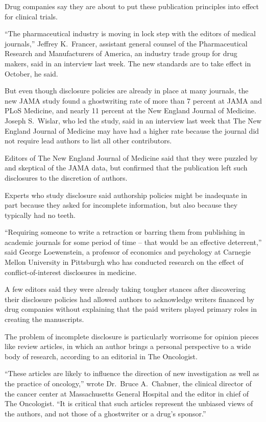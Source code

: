 ﻿\documentclass[12pt]{article}
\begin{document}
Drug companies say they are about to put these publication principles into effect for clinical
trials.

``The pharmaceutical industry is moving in lock step with the editors of medical journals,'' Jeffrey
K.~Francer, assistant general counsel of the Pharmaceutical Research and Manufacturers of America,
an industry trade group for drug makers, said in an interview last week. The new standards are to
take effect in October, he said.

But even though disclosure policies are already in place at many journals, the new JAMA study found
a ghostwriting rate of more than 7 percent at JAMA and PLoS Medicine, and nearly 11 percent at the
New England Journal of Medicine. Joseph S.~Wislar, who led the study, said in an interview last week
that The New England Journal of Medicine may have had a higher rate because the journal did not
require lead authors to list all other contributors.

Editors of The New England Journal of Medicine said that they were puzzled by and skeptical of the
JAMA data, but confirmed that the publication left such disclosures to the discretion of authors.

Experts who study disclosure said authorship policies might be inadequate in part because they asked
for incomplete information, but also because they typically had no teeth.

``Requiring someone to write a retraction or barring them from publishing in academic journals for
some period of time -- that would be an effective deterrent,'' said George Loewenstein, a professor
of economics and psychology at Carnegie Mellon University in Pittsburgh who has conducted research
on the effect of conflict-of-interest disclosures in medicine.

A few editors said they were already taking tougher stances after discovering their disclosure
policies had allowed authors to acknowledge writers financed by drug companies without explaining
that the paid writers played primary roles in creating the manuscripts.

The problem of incomplete disclosure is particularly worrisome for opinion pieces like review
articles, in which an author brings a personal perspective to a wide body of research, according to
an editorial in The Oncologist.

``These articles are likely to influence the direction of new investigation as well as the practice
of oncology,'' wrote Dr.~Bruce A.~Chabner, the clinical director of the cancer center at
Massachusetts General Hospital and the editor in chief of The Oncologist. ``It is critical that such
articles represent the unbiased views of the authors, and not those of a ghostwriter or a drug's
sponsor.''
\end{document}
